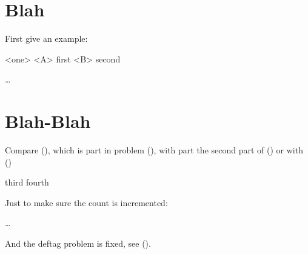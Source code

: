 \documentclass{book}
\begin{document}
\chapter{Blah}

First give an example:

\pex<one>
\a<A> first
\a<B> second
\xe

\ex {}\dots\xe


\chapter{Blah-Blah}

Compare (), which is part  in
problem (), with part the second part of (\nextx)
or with (\anextx)

\pex
\a third
\a fourth
\xe

Just to make sure the count is incremented:

\ex \dots\xe

And the deftag problem is fixed, see ().
\end{document}
